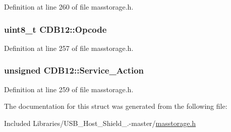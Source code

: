 \-Definition at line 260 of file masstorage.\-h.

\hypertarget{struct_c_d_b12_a75c7fb542c6c0ad6ba4a0e95a49ba1e1}{
\subsubsection[{\-Opcode}]{\setlength{\rightskip}{0pt plus 5cm}uint8\-\_\-t {\bf \-C\-D\-B12\-::\-Opcode}}}\label{struct_c_d_b12_a75c7fb542c6c0ad6ba4a0e95a49ba1e1}


\-Definition at line 257 of file masstorage.\-h.

\hypertarget{struct_c_d_b12_a7d9153a24a41f0432b1467b39d1d5238}{
\subsubsection[{\-Service\-\_\-\-Action}]{\setlength{\rightskip}{0pt plus 5cm}unsigned {\bf \-C\-D\-B12\-::\-Service\-\_\-\-Action}}}\label{struct_c_d_b12_a7d9153a24a41f0432b1467b39d1d5238}


\-Definition at line 259 of file masstorage.\-h.



\-The documentation for this struct was generated from the following file\-:\begin{DoxyCompactItemize}
\item 
\-Included Libraries/\-U\-S\-B\-\_\-\-Host\-\_\-\-Shield\-\_.-\/master/\hyperlink{masstorage_8h}{masstorage.\-h}\end{DoxyCompactItemize}
